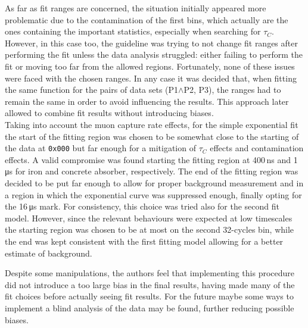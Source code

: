 \documentclass[../main.tex]{subfiles}
\begin{document}
As far as fit ranges are concerned, the situation initially appeared more problematic due to the contamination of the first bins, which actually are the ones containing the important statistics, especially when searching for $\tau_C$. However, in this case too, the guideline was trying to not change fit ranges after performing the fit unless the data analysis struggled: either failing to perform the fit or moving too far from the allowed regions. Fortunately, none of these issues were faced with the chosen ranges. In any case it was decided that, when fitting the same function for the pairs of data sets (P1$\land$P2, P3), the ranges had to remain the same in order to avoid influencing the results. This approach later allowed to combine fit results without introducing biases.\\

Taking into account the muon capture rate effects, for the simple exponential fit the start of the fitting region was chosen to be somewhat close to the starting of the data at \texttt{0x000} but far enough for a mitigation of $\tau_C$ effects and contamination effects. A valid compromise was found starting the fitting region at 400\,\si{\nano \second} and 1\,\si{\micro \second} for iron and concrete absorber, respectively. The end of the fitting region was decided to be put far enough to allow for proper background measurement and in a region in which the exponential curve was suppressed enough, finally opting for the 16\,\si{\micro \second} mark. For consistency, this choice was tried also for the second fit model. However, since the relevant behaviours were expected at low timescales the starting region was chosen to be at most on the second 32-cycles bin, while the end was kept consistent with the first fitting model allowing for a better estimate of background.

Despite some manipulations, the authors feel that implementing this procedure did not introduce a too large bias in the final results, having made many of the fit choices before actually seeing fit results. For the future maybe some ways to implement a blind analysis of the data may be found, further reducing possible biases.
\end{document}

